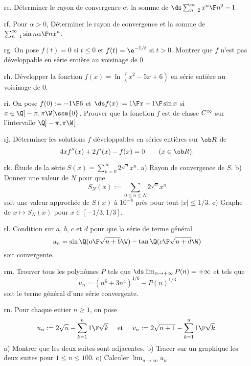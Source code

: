 \exo [Level=2,Fight=0,Learn=0,Type=\Exercices,Field=\SériesEntières,Origin=] re. 
Déterminer le rayon de convergence 
et la somme de $\ds\sum_{n=2}^\infty{x^n\F n^2-1}$. 

\exo [Level=2,Fight=0,Learn=0,Type=\Exercices,Field=\SériesEntières,Origin=] rf. 
Pour $\alpha>0$, Déterminer le rayon de convergence et la somme de 
$\sum_{n=1}^\infty{\sin n\alpha\F n}x^n$. 

\exo [Level=2,Fight=0,Learn=0,Type=\Exercices,Field=\SériesEntières,Origin=] rg. 
On pose $f(t)=0$ si $t\le 0$ et $f(t)=\e^{-1/t}$ si $t>0$. 
Montrer que $f$ n'est pas développable en série entière au voisinage de $0$. 

\exo [Level=2,Fight=0,Learn=0,Type=\Exercices,Field=\SériesEntières,Origin=] rh. 
Développer la fonction $f(x)=\ln(x^2-5x+6)$ en série entière au voisinage de $0$. 

\exo [Level=2,Fight=0,Learn=0,Type=\Exercices,Field=\SériesEntières,Origin=] ri. 
On pose $f(0):=-{1\F6}$ et $\ds f(x):={1\F x}-{1\F\sin x}$ si $x\in\Q]-\pi,\pi\W[\ssm\{0\}$. 
Prouver que la fonction $f$ est de classe $\sc C^\infty$ sur l'intervalle $\Q]-\pi,\pi\W[$. 

\exo [Level=2,Fight=0,Learn=0,Type=\Exercices,Field=\SériesEntières,Origin=] rj. 
Déterminer les solutions $f$ développables en séries entières sur $\ob R$ de 
$$
4xf''(x)+2f'(x)-f(x)=0\qquad(x\in\ob R).
$$

\exo [Level=2,Fight=0,Learn=0,Type=\Exercices,Field=\SériesEntières,Origin=] rk. 
\'Etude de la série $S(x)=\sum_{n=0}^\infty2^{\sqrt n}x^n$. \pn
a) Rayon de convergence de $S$. \pn
b) Donner une valeur de $N$ pour que 
$$
S_N(x):=\sum_{0\le n\le N}2^{\sqrt n}x^n
$$ 
soit une valeur approchée de $S(x)$ à $10^{-8}$ près 
pour tout $|x|\le1/3$. \pn
c) Graphe de $x\mapsto S_N(x)$ pour $x\in[-1/3,1/3]$. 

\exo [Level=2,Fight=0,Learn=0,Type=\Maple,Field=\SériesEntières,Origin=] rl. 
Condition sur $a$, $b$, $c$ et $d$ pour que la série de terme général 
$$
u_n=\sin\Q({a\F\sqrt{n+b}}\W)-\tan\Q({c\F\sqrt{n+d}}\W)
$$
soit convergente. 

\exo [Level=2,Fight=0,Learn=0,Type=\Maple,Field=\SériesEntières,Origin=] rm. 
Trouver tous les polynômes $P$ tels que $\ds\lim_{n\to+\infty}P(n)=+\infty$ et 
tels que 
$$
u_n=(n^6+3n^4)^{1/6}-P(n)^{1/3}
$$
soit le terme général d'une série convergente. 

\exo [Level=1,Fight=0,Learn=0,Type=\Maple,Field=\Suites,Origin=] rn. 
Pour chaque entier $n\ge1$, on pose 
$$
u_n:=2\sqrt n-\sum_{k=1}^n{1\F\sqrt k}\quad\hbox{ et }\quad v_n:=2\sqrt{n+1}-\sum_{k=1}^n{1\F\sqrt k}. 
$$
a) Montrer que les deux suites sont adjacentes. \pn
b) Tracer sur un graphique les deux suites pour $1\le n\le 100$. \pn
c) Calculer $\lim_{n\to\infty} u_n$. 

